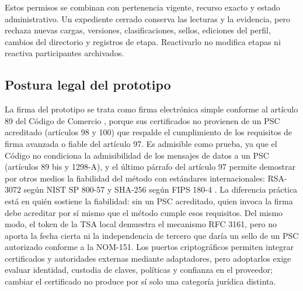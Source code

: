 Estos permisos se combinan con pertenencia vigente, recurso exacto y estado administrativo. Un expediente cerrado conserva las lecturas y la evidencia, pero rechaza nuevas cargas, versiones, clasificaciones, sellos, ediciones del perfil, cambios del directorio y registros de etapa. Reactivarlo no modifica etapas ni reactiva participantes archivados.

\subsection{Postura legal del prototipo}\label{sec:postura-legal}

La firma del prototipo se trata como firma electrónica simple conforme al artículo 89 del Código de Comercio \cite{ccom2018}, porque sus certificados no provienen de un PSC acreditado (artículos 98 y 100) que respalde el cumplimiento de los requisitos de firma avanzada o fiable del artículo 97. Es admisible como prueba, ya que el Código no condiciona la admisibilidad de los mensajes de datos a un PSC (artículos 89 bis y 1298-A), y el último párrafo del artículo 97 permite demostrar por otros medios la fiabilidad del método con estándares internacionales: RSA-3072 según NIST SP 800-57 \cite{barker2020} y SHA-256 según FIPS 180-4 \cite{nist2015fips1804}. La diferencia práctica está en quién sostiene la fiabilidad: sin un PSC acreditado, quien invoca la firma debe acreditar por sí mismo que el método cumple esos requisitos. Del mismo modo, el token de la TSA local demuestra el mecanismo RFC 3161, pero no aporta la fecha cierta ni la independencia de tercero que daría un sello de un PSC autorizado conforme a la NOM-151. Los puertos criptográficos permiten integrar certificados y autoridades externas mediante adaptadores, pero adoptarlos exige evaluar identidad, custodia de claves, políticas y confianza en el proveedor; cambiar el certificado no produce por sí solo una categoría jurídica distinta.

